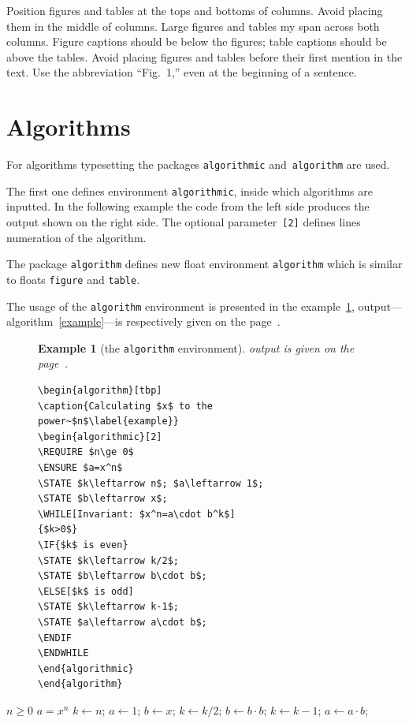 \documentclass[conference]{IEEEtran}
\newtheorem{example}[remark]{Example}
\begin{document}
Position figures and tables at the tops and bottoms of columns.  Avoid placing them in the middle of columns.  Large figures and tables my span across both columns.  Figure captions should be below the figures; table captions should be above the tables.  Avoid placing figures and tables before their first mention in the text.  Use the abbreviation ``Fig.~1,'' even at the beginning of a sentence.


\section{Algorithms}

For algorithms typesetting the packages \verb|algorithmic| and~\verb|algorithm| are used. 

The first one defines environment \verb|algorithmic|, inside which algorithms are inputted. In the following example the code from the left side produces the output shown on the right side. The optional parameter~\verb|[2]| defines lines numeration of the algorithm.

The  package \verb|algorithm| defines new float environment \verb|algorithm| which is  similar to floats \verb|figure| and \verb|table|. 

The usage of the \verb|algorithm| environment is presented in the example~\ref{algorytm}, output---algorithm~\ref{example}---is respectively given on the page~\pageref{example}.

\begin{figure}
\begin{example}[the \texttt{algorithm} environment]\label{algorytm} output is given on the page~\pageref{example}.
\begin{verbatim}
\begin{algorithm}[tbp]
\caption{Calculating $x$ to the 
power~$n$\label{example}}
\begin{algorithmic}[2]
\REQUIRE $n\ge 0$
\ENSURE $a=x^n$
\STATE $k\leftarrow n$; $a\leftarrow 1$; 
\STATE $b\leftarrow x$;
\WHILE[Invariant: $x^n=a\cdot b^k$]
{$k>0$}
\IF{$k$ is even}
\STATE $k\leftarrow k/2$;
\STATE $b\leftarrow b\cdot b$;
\ELSE[$k$ is odd]
\STATE $k\leftarrow k-1$;
\STATE $a\leftarrow a\cdot b$;
\ENDIF
\ENDWHILE
\end{algorithmic}
\end{algorithm}
\end{verbatim}
\end{example}
\end{figure}

\begin{algorithm}[t]
\caption{Calculating $x$ to the 
power~$n$\label{example}}
\begin{algorithmic}[2]
\REQUIRE $n\ge 0$
\ENSURE $a=x^n$
\STATE $k\leftarrow n$; $a\leftarrow 1$; 
\STATE $b\leftarrow x$;
\STATE $k\leftarrow k/2$;
\STATE $b\leftarrow b\cdot b$;
\ELSE[$k$ is odd]
\STATE $k\leftarrow k-1$;
\STATE $a\leftarrow a\cdot b$;
\ENDIF
\ENDWHILE
\end{algorithmic}
\end{algorithm}
\end{document}
